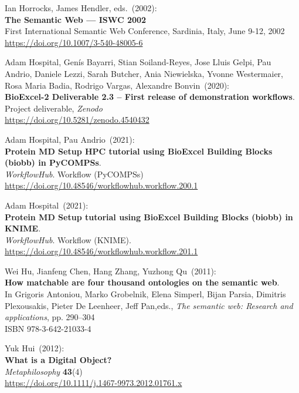 \begin{thebibliography}{9}
Ian Horrocks, James Hendler, eds.~(2002): \\
\textbf{The {Semantic Web} --- {ISWC} 2002} \\
First International Semantic Web Conference, Sardinia, Italy, June 9-12, 2002\\
\url{https://doi.org/10.1007/3-540-48005-6}

Adam Hospital, Genís Bayarri, Stian Soiland-Reyes, Jose Lluis
Gelpi, Pau Andrio, Daniele Lezzi, Sarah Butcher, Ania Niewielska, Yvonne
Westermaier, Rosa Maria Badia, Rodrigo Vargas, Alexandre Bonvin~(2020): \\
\textbf{BioExcel-2 Deliverable 2.3 -- First release of demonstration workflows}.\\
Project deliverable, \emph{Zenodo}\\
\url{https://doi.org/10.5281/zenodo.4540432}

Adam Hospital, Pau Andrio~(2021): \\
\textbf{Protein MD Setup HPC tutorial using BioExcel Building Blocks (biobb) in PyCOMPSs}.\\
\emph{WorkflowHub}. Workflow (PyCOMPSs)\\
\url{https://doi.org/10.48546/workflowhub.workflow.200.1}

Adam Hospital~(2021): \\
\textbf{Protein MD Setup tutorial using BioExcel Building Blocks (biobb)
in KNIME}.\\
\emph{WorkflowHub}. Workflow (KNIME).\\
\url{https://doi.org/10.48546/workflowhub.workflow.201.1}

Wei Hu, Jianfeng Chen, Hang Zhang, Yuzhong Qu~(2011): \\
\textbf{How matchable are four thousand ontologies on the semantic web}. \\
In Grigoris
Antoniou, Marko Grobelnik, Elena Simperl, Bijan Parsia, Dimitris
Plexousakis, Pieter De Leenheer, Jeff Pan,eds., \emph{The semantic
web: {Research} and applications}, pp. 290--304 \\
ISBN 978-3-642-21033-4

Yuk Hui~(2012): \\
\textbf{What is a Digital Object?}\\
\emph{Metaphilosophy} \textbf{43}(4)\\
\url{https://doi.org/10.1111/j.1467-9973.2012.01761.x}


\end{thebibliography}
